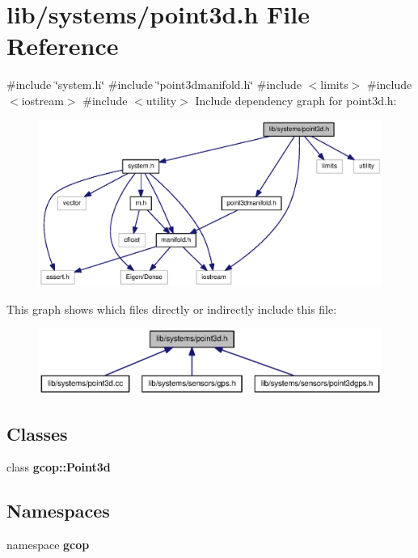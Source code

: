 \section{lib/systems/point3d.h \-File \-Reference}
\label{point3d_8h}
{\ttfamily \#include \char`\"{}system.\-h\char`\"{}}\*
{\ttfamily \#include \char`\"{}point3dmanifold.\-h\char`\"{}}\*
{\ttfamily \#include $<$limits$>$}\*
{\ttfamily \#include $<$iostream$>$}\*
{\ttfamily \#include $<$utility$>$}\*
\-Include dependency graph for point3d.\-h\-:\nopagebreak
\begin{figure}[H]
\begin{center}
\leavevmode
\includegraphics[width=350pt]{point3d_8h__incl}
\end{center}
\end{figure}
\-This graph shows which files directly or indirectly include this file\-:\nopagebreak
\begin{figure}[H]
\begin{center}
\leavevmode
\includegraphics[width=350pt]{point3d_8h__dep__incl}
\end{center}
\end{figure}
\subsection*{\-Classes}
\begin{DoxyCompactItemize}
\item 
class {\bf gcop\-::\-Point3d}
\end{DoxyCompactItemize}
\subsection*{\-Namespaces}
\begin{DoxyCompactItemize}
\item 
namespace {\bf gcop}
\end{DoxyCompactItemize}

